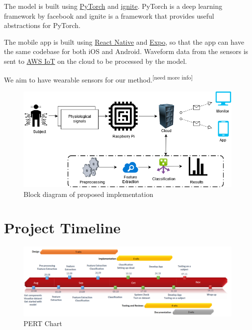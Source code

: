 \documentclass[11pt]{article}
\theoremstyle{definition}
\begin{document}
    The model is built using \href{https://github.com/pytorch/pytorch}{PyTorch} and \href{https://github.com/pytorch/ignite}{ignite}.
    PyTorch is a deep learning framework by facebook and ignite is a framework that provides useful abstractions for PyTorch.
    
    The mobile app is built using \href{https://facebook.github.io/react-native/}{React Native} and \href{https://expo.io/}{Expo}, so that the app can have the same codebase for both iOS and Android.
    Waveform data from the sensors is sent to \href{https://aws.amazon.com/iot/}{AWS IoT} on the cloud to be processed by the model.

    We aim to have wearable sensors for our method.\textsuperscript{[need more info]}

    \begin{figure}[h]
      \centering
      \includegraphics[width=\textwidth, scale=1.5]{schematic}
      \caption{Block diagram of proposed implementation}
    \end{figure}
  
  \newpage
  \section{Project Timeline}
    \begin{figure}[h]
      \centering
      \includegraphics[width=\textwidth, scale=1.5]{pert_chart}
      \caption{PERT Chart}
    \end{figure}
  
  \newpage
  
  
\end{document}
